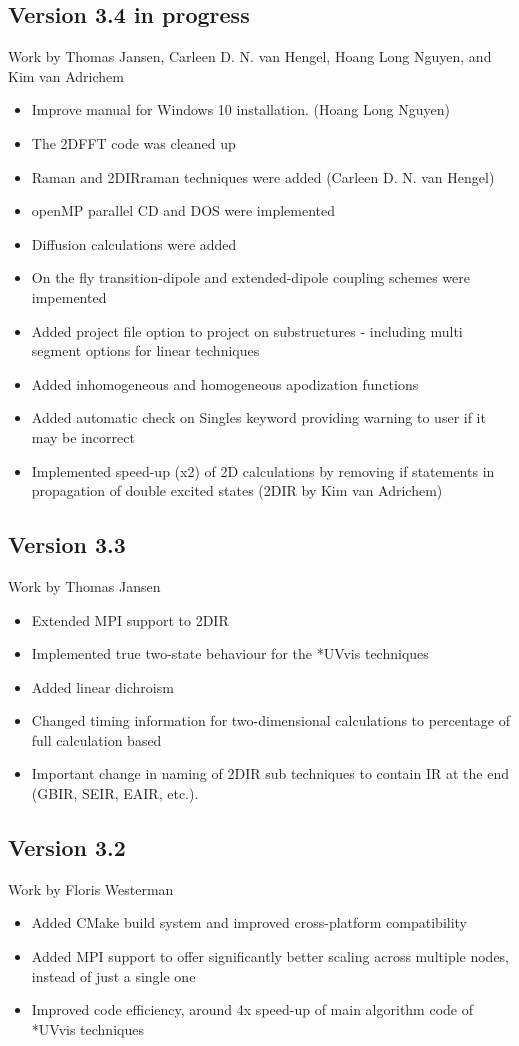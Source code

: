 \documentclass[12pt]{book}
\begin{document}
\subsection{Version 3.4 in progress}
{\small Work by Thomas Jansen, Carleen D. N. van Hengel, Hoang Long Nguyen, and Kim van Adrichem}
\begin{itemize}
\item Improve manual for Windows 10 installation. (Hoang Long Nguyen)
\item The 2DFFT code was cleaned up
\item Raman and 2DIRraman techniques were added (Carleen D. N. van Hengel)
\item openMP parallel CD and DOS were implemented
\item Diffusion calculations were added
\item On the fly transition-dipole and extended-dipole coupling schemes were impemented
\item Added project file option to project on substructures - including multi segment options for linear techniques
\item Added inhomogeneous and homogeneous apodization functions
\item Added automatic check on Singles keyword providing warning to user if it may be incorrect
\item Implemented speed-up (x2) of 2D calculations by removing if statements in propagation of double excited states (2DIR by Kim van Adrichem)
\end{itemize}
\subsection{Version 3.3}
{\small Work by Thomas Jansen}
\begin{itemize}
\item Extended MPI support to 2DIR
\item Implemented true two-state behaviour for the *UVvis techniques
\item Added linear dichroism
\item Changed timing information for two-dimensional calculations to percentage of full calculation based
\item Important change in naming of 2DIR sub techniques to contain IR at the end (GBIR, SEIR, EAIR, etc.).
\end{itemize}
	\subsection{Version 3.2}
{\small Work by Floris Westerman}
\begin{itemize}
\item Added CMake build system and improved cross-platform compatibility
\item Added MPI support to offer significantly better scaling across multiple nodes, instead of just a single one
\item Improved code efficiency, around 4x speed-up of main algorithm code of *UVvis techniques
\end{itemize}
\end{document}
